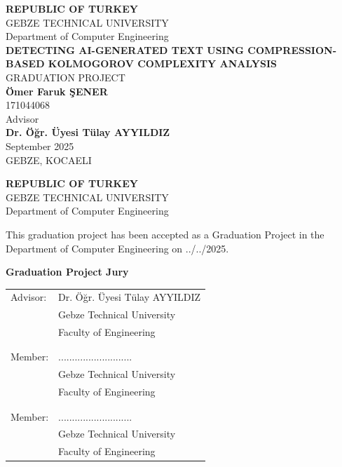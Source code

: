 \documentclass[12pt,a4paper]{report}
\begin{document}
\begin{titlepage}
    \centering
    \vspace*{2cm}
    {\Large \textbf{REPUBLIC OF TURKEY}\\
    GEBZE TECHNICAL UNIVERSITY\\
    \vspace{0.5cm}
    Department of Computer Engineering\\}
    \vfill
    {\huge \textbf{DETECTING AI-GENERATED TEXT USING COMPRESSION-BASED KOLMOGOROV COMPLEXITY ANALYSIS}\\}
    \vfill
    {\Large GRADUATION PROJECT\\}
    \vspace{1cm}
    {\large \textbf{\"Omer Faruk \c{S}ENER}\\
    171044068\\}
    \vspace{1cm}
    {\large Advisor\\
    \textbf{Dr. \"O\u{g}r. \"Uyesi T\"ulay AYYILDIZ}\\}
    \vspace{2cm}
    {\large September 2025\\
    GEBZE, KOCAELI}
\end{titlepage}

\begin{titlepage}
    \centering
    \vspace*{2cm}
    {\Large \textbf{REPUBLIC OF TURKEY}\\
    GEBZE TECHNICAL UNIVERSITY\\
    \vspace{0.5cm}
    Department of Computer Engineering\\}
    \vfill

    This graduation project has been accepted as a Graduation Project in the Department of Computer Engineering on ../../2025.

    \vspace{3cm}

    \textbf{Graduation Project Jury}

    \vspace{2cm}

    \begin{tabular}{ll}
    Advisor: & Dr. \"O\u{g}r. \"Uyesi T\"ulay AYYILDIZ \\
    & Gebze Technical University \\
    & Faculty of Engineering \\
    \\
    \\
    Member: & ........................... \\
    & Gebze Technical University \\
    & Faculty of Engineering \\
    \\
    \\
    Member: & ........................... \\
    & Gebze Technical University \\
    & Faculty of Engineering \\
    \end{tabular}
\end{titlepage}
\end{document}
